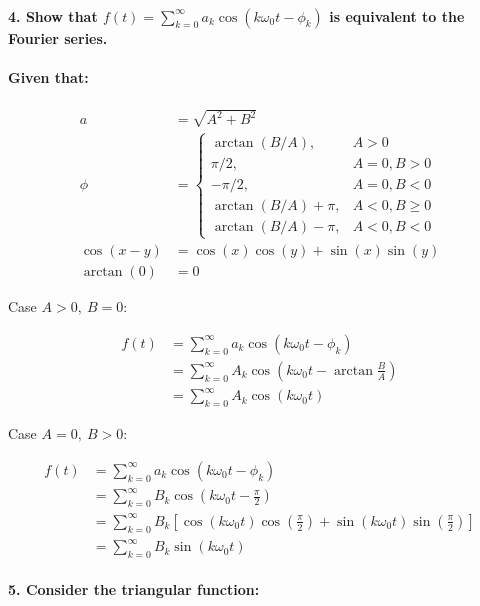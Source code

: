 \paragraph{4. Show that $f(t) = \sum_{k=0}^\infty a_k \cos(k \omega_0 t - \phi_k)$ is equivalent to the Fourier series.}

\paragraph{Given that:}

\begin{align}
	a &= \sqrt{A^2 + B^2} \\
	\phi &= 
	\begin{cases}
		\arctan(B/A), & A > 0\\
		\pi/2, & A=0, B>0\\
		-\pi/2, & A=0, B<0\\
		\arctan(B/A)+\pi, & A<0, B \geq 0\\
		\arctan(B/A)-\pi, & A<0, B < 0
	\end{cases}
	\\
	\cos(x-y) &= \cos(x)\cos(y) + \sin(x)\sin(y)\\
	\arctan(0) &= 0
\end{align}

Case $A>0,\ B=0$:

\begin{align*}
	f(t) &= \sum_{k=0}^\infty a_k \cos(k \omega_0 t - \phi_k) \\
	&= \sum_{k=0}^\infty A_k \cos\left(k \omega_0 t - \arctan{\frac{B}{A}}\right) \\
	&= \sum_{k=0}^\infty A_k \cos(k \omega_0 t) 
\end{align*}

Case $A=0,\ B>0$:

\begin{align*}
	f(t) &= \sum_{k=0}^\infty a_k \cos(k \omega_0 t - \phi_k) \\
	&= \sum_{k=0}^\infty B_k \cos\left(k \omega_0 t - \frac{\pi}{2}\right) \\
	&= \sum_{k=0}^\infty B_k \left[\cos(k \omega_0 t) \cos\left(\frac{\pi}{2}\right) + \sin(k \omega_0 t) \sin\left(\frac{\pi}{2}\right) \right]\\
	&= \sum_{k=0}^\infty B_k \sin(k \omega_0 t) 
\end{align*}

\paragraph{5. Consider the triangular function:}

